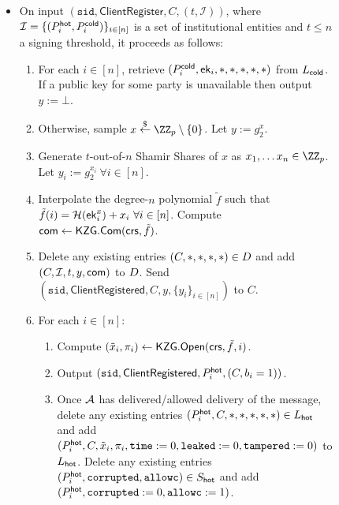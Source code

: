 \begin{figure*}
{{\begin{itemize}
\item On input $(\texttt{sid},\mathsf{ClientRegister}, C, (t, \mathcal{I}))$, where $\mathcal{I} = \{(P_i^{\mathsf{hot}}, P_i^{\mathsf{cold}})\}_{i \in [n]}$ is a set of institutional entities
and $t \leq n$ a signing threshold,
it proceeds as follows:
    \begin{enumerate}
    \item For each $i \in [n]$, retrieve $(P_i^{\mathsf{cold}}, \mathsf{ek}_i, *, *, *, *, *)$ from $L_{\mathsf{cold}}$. If a public key for some party is unavailable then output $y := \bot$.
    \item Otherwise, sample $x \sample \ZZ_p \setminus \{0\}$. Let $y := g_2^x$.
    \item Generate $t$-out-of-$n$ Shamir Shares of $x$ as $x_1, \ldots x_n \in \ZZ_p$. Let $y_i := g_2^{x_i} ~\forall i \in [n]$.
    \item Interpolate the degree-$n$ polynomial $\tilde{f}$ such that $\tilde{f}(i) = \mathcal{H}(\mathsf{ek}_i^x) + x_i~\forall i \in [n]$. Compute $\mathsf{com} \gets \mathsf{KZG}.\mathsf{Com}(\mathsf{crs}, \tilde{f})$. %
    \item Delete any existing entries $(C, *, *, *, *) \in D$ and add $(C, \mathcal{I}, t, y, \mathsf{com})$ to $D$. Send $(\texttt{sid},\allowbreak \mathsf{ClientRegistered}, C, y, \{y_i\}_{i \in [n]})$ to $C$.
    \item For each $i \in [n]$:
    \begin{enumerate}
        \item Compute $(\tilde{x}_i, \pi_i) \gets \mathsf{KZG}.\mathsf{Open}(\mathsf{crs}, \tilde{f}, i)$. %
        \item Output $(\texttt{sid},\mathsf{ClientRegistered}, P_i^{\mathsf{hot}}, (C, b_i=1))$.
        \item Once $\mathcal{A}$ has delivered/allowed delivery of the message, delete any existing entries $(P_i^{\mathsf{hot}}, C, *, *, *, *, *) \in L_{\mathsf{hot}}$ and add $(P_i^{\mathsf{hot}}, C, \tilde{x}_i, \pi_i, \texttt{time} := 0, \texttt{leaked} := 0,\allowbreak \texttt{tampered} := 0)$ to $L_{\mathsf{hot}}$. Delete any existing entries $(P_i^{\mathsf{hot}}, \texttt{corrupted}, \texttt{allowc}) \in S_{\mathsf{hot}}$ and add $(P_i^{\mathsf{hot}}, \texttt{corrupted} := 0, \texttt{allowc} := 1)$.

\end{enumerate}
\end{enumerate}
\end{itemize}}}
\end{figure*}
